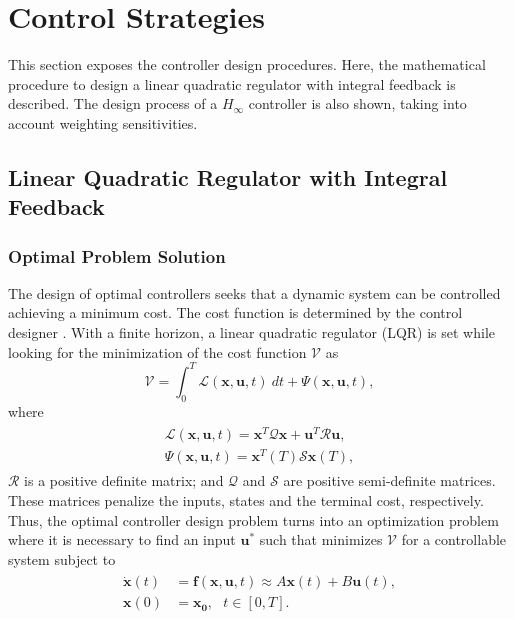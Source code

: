 \section{Control Strategies}
\label{sec:controlstrategies}
This section exposes the controller design procedures. Here, the mathematical procedure to design a linear quadratic regulator with integral feedback is described. The design process of a $H_{\infty}$ controller is also shown, taking into account weighting sensitivities.

\subsection{Linear Quadratic Regulator with Integral Feedback}
\subsubsection{Optimal Problem Solution}
The design of optimal controllers seeks that a dynamic system can be controlled achieving a minimum cost. The cost function is determined by the control designer \cite{Steinbuch2007}. With a finite horizon, a linear quadratic regulator (LQR) is set while looking for the minimization of the cost function $\mathcal{V}$ as
\begin{equation}
\label{eqn:cost}
\mathcal{V} = \int_{0}^{T}\mathcal{L}(\mathbf{x},\mathbf{u},t)\ dt + \Psi(\mathbf{x},\mathbf{u},t),
\end{equation}
where
\begin{align}
\begin{split}
\mathcal{L}(\mathbf{x},\mathbf{u},t) = \mathbf{x}^{T}\mathcal{Q}\mathbf{x} + \mathbf{u}^{T}\mathcal{R}\mathbf{u},\\[5px]
\Psi(\mathbf{x},\mathbf{u},t) = \mathbf{x}^{T}(T)\mathcal{S}\mathbf{x}(T),
\end{split}
\end{align}
$\mathcal{R}$ is a positive definite matrix; and $\mathcal{Q}$ and $\mathcal{S}$ are positive semi-definite matrices. These matrices penalize the inputs, states and the terminal cost, respectively. Thus, the optimal controller design problem turns into an optimization problem where it is necessary to find an input $\mathbf{u}^{*}$ such that minimizes $\mathcal{V}$ for a controllable system subject to
\begin{align}
\begin{split}
\dot{\mathbf{x}}(t) & = \mathbf{f}(\mathbf{x}, \mathbf{u}, t) \approx A\mathbf{x}(t)+B\mathbf{u}(t),\\[5px]
\mathbf{x}(0) & = \mathbf{x_0},\ \ \ t \in [0, T].
\end{split}
\end{align}
